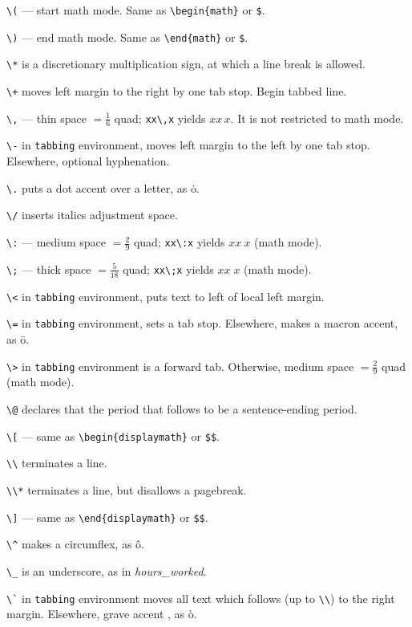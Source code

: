 \verb"\(" --- start math mode. Same as \verb"\begin{math}" or \verb"$".

\verb"\)" --- end math mode.  Same as \verb"\end{math}" or \verb"$".

\verb"\*" is a discretionary multiplication sign, at which a line break
	is allowed.

\verb"\+" moves left margin to the right by one tab stop.
	Begin tabbed line.

\verb"\," --- thin space $ = \frac{1}{6} $ quad;
	\verb"xx\,x" yields $xx\,x$.  It is not restricted to math mode.

\verb"\-" in \verb"tabbing" environment, moves left margin to the left
	by one tab stop. Elsewhere, optional hyphenation.

\verb"\." puts a dot accent over a letter, as \.o.

\verb"\/" inserts italics adjustment space.

\verb"\:" --- medium space $ = \frac{2}{9} $ quad;
	\verb"xx\:x" yields $xx\:x$ (math mode).

\verb"\;" --- thick space $ = \frac{5}{18} $ quad;
	\verb"xx\;x" yields $xx\;x$ (math mode).

\verb"\<" in \verb"tabbing" environment, puts text to left of local
	left margin.

\verb"\=" in \verb"tabbing" environment, sets a tab stop.
	Elsewhere, makes a macron accent, as \=o.

\verb"\>" in \verb"tabbing" environment is a forward tab. Otherwise,
	medium space $ = \frac{2}{9}$ quad (math mode).

\verb"\@" declares that the period that follows to be a sentence-ending
	period.

\verb"\[" --- same as \verb"\begin{displaymath}" or \verb"$$".

\verb"\\" terminates a line.

\verb"\\*" terminates a line, but disallows a pagebreak.

\verb"\]" --- same as \verb"\end{displaymath}" or \verb"$$".

\verb"\^" makes a circumflex, as \^o.

\verb"\_" is an underscore, as in {\em hours\_worked}.

\verb"\`" in \verb"tabbing" environment moves all text which follows (up to
	\verb"\\") to the right margin. Elsewhere, grave accent
	, as \`o.

